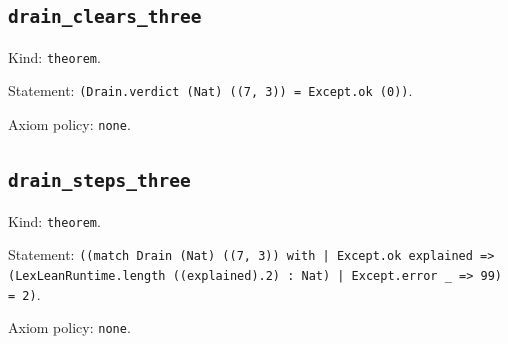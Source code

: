 \documentclass[11pt]{article}
\begin{document}
\subsection*{\texttt{drain\_clears\_three}}
\noindent Kind: \texttt{theorem}.\par
\noindent Statement: \texttt{(Drain.verdict (Nat) ((7, 3)) = Except.ok (0))}.\par
\noindent Axiom policy: \texttt{none}.\par
\subsection*{\texttt{drain\_steps\_three}}
\noindent Kind: \texttt{theorem}.\par
\noindent Statement: \texttt{((match Drain (Nat) ((7, 3)) with | Except.ok explained => (LexLeanRuntime.length ((explained).2) : Nat) | Except.error \_ => 99) = 2)}.\par
\noindent Axiom policy: \texttt{none}.\par
\end{document}
